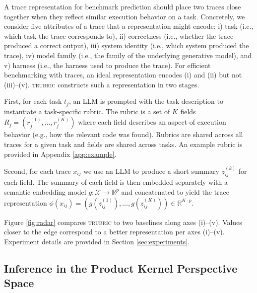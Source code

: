 \documentclass{article}
\newcommand{\trubric}{\textsc{trubric}}
\begin{document}
A trace representation for benchmark prediction should place two traces close together when they reflect similar execution behavior on a task.
Concretely, we consider five attributes of a trace that a representation might encode: i) task (i.e., which task the trace corresponds to), ii) correctness (i.e., whether the trace produced a correct output), iii) system identity (i.e., which system produced the trace), iv) model family (i.e., the family of the underlying generative model), and v) harness (i.e., the harness used to produce the trace).
For efficient benchmarking with traces, an ideal representation encodes (i) and (ii) but not (iii)--(v).
\trubric{} constructs such a representation in two stages.

First, for each task $t_{j}$, an LLM is prompted with the task description to instantiate a task-specific rubric.
The rubric is a set of $K$ fields $R_{j} = (r_{j}^{(1)}, \hdots, r_{j}^{(K)})$ where each field describes an aspect of execution behavior (e.g., how the relevant code was found).
Rubrics are shared across all traces for a given task and fields are shared across tasks.
An example rubric is provided in Appendix \ref{app:example}.

Second, for each trace $x_{ij}$ we use an LLM to produce a short summary $z_{ij}^{(k)} $ for each field.
The summary of each field is then embedded separately with a semantic embedding model $g: \mathcal{X} \to \mathbb{R}^{p} $ and concatenated to yield the trace representation $\phi(x_{ij}) = ( g(z_{ij}^{(1)}), \hdots, g(z_{ij}^{(K)})) \in \mathbb{R}^{K \cdot p} $.

Figure \ref{fig:radar} compares \trubric{} to two baselines along axes (i)--(v).
Values closer to the edge correspond to a better representation per axes (i)--(v).
Experiment details are provided in Section \ref{sec:experiments}.

\subsection{Inference in the Product Kernel Perspective Space}
\label{sec:method-pkps}
\end{document}
